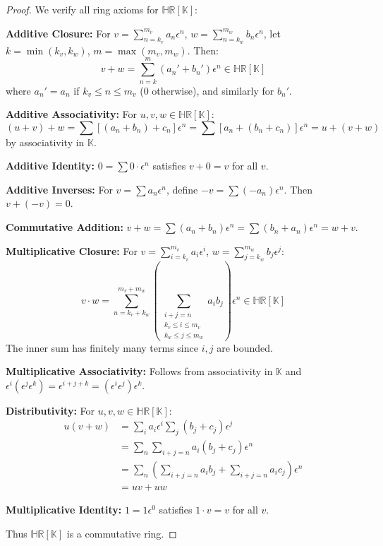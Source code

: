 \documentclass[10pt, oneside]{article}
\newcommand{\HR}{\mathbb{HR}}
\newcommand{\K}{\mathbb{K}}
\begin{document}
\begin{proof}
We verify all ring axioms for $\HR[\K]$:


\textbf{Additive Closure:} For $v = \sum_{n=k_v}^{m_v} a_n \epsilon^n$, $w = \sum_{n=k_w}^{m_w} b_n \epsilon^n$, let $k = \min(k_v,k_w)$, $m = \max(m_v,m_w)$. Then:
\[
v + w = \sum_{n=k}^{m} (a_n' + b_n') \epsilon^n \in \HR[\K]
\]
where $a_n' = a_n$ if $k_v \leq n \leq m_v$ (0 otherwise), and similarly for $b_n'$.


\textbf{Additive Associativity:} For $u,v,w \in \HR[\K]$:
\[
(u + v) + w = \sum [(a_n + b_n) + c_n] \epsilon^n = \sum [a_n + (b_n + c_n)] \epsilon^n = u + (v + w)
\]
by associativity in $\K$.


\textbf{Additive Identity:} $0 = \sum 0 \cdot \epsilon^n$ satisfies $v + 0 = v$ for all $v$.


\textbf{Additive Inverses:} For $v = \sum a_n \epsilon^n$, define $-v = \sum (-a_n) \epsilon^n$. Then $v + (-v) = 0$.


\textbf{Commutative Addition:} $v + w = \sum (a_n + b_n) \epsilon^n = \sum (b_n + a_n) \epsilon^n = w + v$.


\textbf{Multiplicative Closure:} For $v = \sum_{i=k_v}^{m_v} a_i \epsilon^i$, $w = \sum_{j=k_w}^{m_w} b_j \epsilon^j$:
\[
v \cdot w = \sum_{n=k_v+k_w}^{m_v+m_w} \left( \sum_{\substack{i+j=n \\ k_v \leq i \leq m_v \\ k_w \leq j \leq m_w}} a_i b_j \right) \epsilon^n \in \HR[\K]
\]
The inner sum has finitely many terms since $i,j$ are bounded.


\textbf{Multiplicative Associativity:} Follows from associativity in $\K$ and $\epsilon^{i}( \epsilon^{j} \epsilon^{k}) = \epsilon^{i+j+k} = (\epsilon^{i} \epsilon^{j})\epsilon^{k}$.


\textbf{Distributivity:} For $u,v,w \in \HR[\K]$:
\begin{align*}
u(v + w) &= \sum_i a_i \epsilon^i \sum_j (b_j + c_j) \epsilon^j \\
&= \sum_n \sum_{i+j=n} a_i (b_j + c_j) \epsilon^n \\
&= \sum_n \left( \sum_{i+j=n} a_i b_j + \sum_{i+j=n} a_i c_j \right) \epsilon^n \\
&= uv + uw
\end{align*}


\textbf{Multiplicative Identity:} $1 = 1\epsilon^0$ satisfies $1 \cdot v = v$ for all $v$.


Thus $\HR[\K]$ is a commutative ring.
\end{proof}
\end{document}
